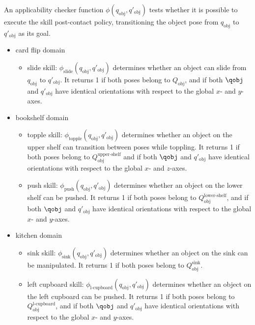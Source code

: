 An applicability checker function \( \phi (q_{\text{obj}}, q'_{\text{obj}}) \) tests whether it is possible to execute the skill post-contact policy, transitioning the object pose from \( q_{\text{obj}} \) to \( q'_{\text{obj}} \) as its goal.
\begin{itemize}
    \item card flip domain
    \begin{itemize}
        \item slide skill: \( \phi_{\text{slide}}(q_{\text{obj}}, q'_{\text{obj}}) \) determines whether an object can slide from \( q_{\text{obj}} \) to \( q'_{\text{obj}} \). It returns 1 if both poses belong to \( Q_{\text{obj}} \), and if both $\qobj$ and $q'_\text{obj}$ have identical orientations with respect to the global \( x \)- and \( y \)-axes.
    \end{itemize}
    \item bookshelf domain
    \begin{itemize}
        \item topple skill: \( \phi_{\text{topple}}(q_{\text{obj}}, q'_{\text{obj}}) \) determines whether an object on the upper shelf can transition between poses while toppling. It returns 1 if both poses belong to \( Q^\text{upper-shelf}_{\text{obj}} \) and if both $\qobj$ and $q'_\text{obj}$ have identical orientations with respect to the global \( x \)- and \( z \)-axes.
        \item push skill: \( \phi_{\text{push}}(q_{\text{obj}}, q'_{\text{obj}}) \) determines whether an object on the lower shelf can be pushed. It returns 1 if both poses belong to \( Q^\text{lower-shelf}_{\text{obj}} \), and if both $\qobj$ and $q'_\text{obj}$ have identical orientations with respect to the global \( x \)- and \( y \)-axes.
    \end{itemize}
    \item kitchen domain
    \begin{itemize}
        \item sink skill: \( \phi_{\text{sink}}(q_{\text{obj}}, q'_{\text{obj}}) \) determines whether an object on the sink can be manipulated. It returns 1 if both poses belong to \( Q_{\text{obj}}^{\text{sink}} \).
        \item left cupboard skill: \( \phi_{\text{l-cupboard}}(q_{\text{obj}}, q'_{\text{obj}}) \) determines whether an object on the left cupboard can be pushed. It returns 1 if both poses belong to \( Q^\text{l-cupboard}_{\text{obj}} \), and if both $\qobj$ and $q'_\text{obj}$ have identical orientations with respect to the global \( x \)- and \( y \)-axes.

\end{itemize}
\end{itemize}
